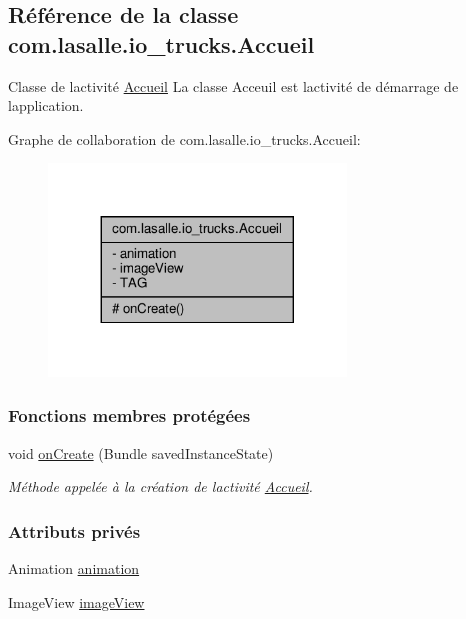 \hypertarget{classcom_1_1lasalle_1_1io__trucks_1_1_accueil}{}\subsection{Référence de la classe com.\+lasalle.\+io\+\_\+trucks.\+Accueil}
\label{classcom_1_1lasalle_1_1io__trucks_1_1_accueil}


Classe de l\textquotesingle{}activité \hyperlink{classcom_1_1lasalle_1_1io__trucks_1_1_accueil}{Accueil}  La classe Acceuil est l\textquotesingle{}activité de démarrage de l\textquotesingle{}application.  




Graphe de collaboration de com.\+lasalle.\+io\+\_\+trucks.\+Accueil\+:
\nopagebreak
\begin{figure}[H]
\begin{center}
\leavevmode
\includegraphics[width=224pt]{classcom_1_1lasalle_1_1io__trucks_1_1_accueil__coll__graph}
\end{center}
\end{figure}
\subsubsection*{Fonctions membres protégées}
\begin{DoxyCompactItemize}
\item 
void \hyperlink{classcom_1_1lasalle_1_1io__trucks_1_1_accueil_acd7cff413b44344de6b037c85f4f50bb}{on\+Create} (Bundle saved\+Instance\+State)
\begin{DoxyCompactList}\small\item\em Méthode appelée à la création de l\textquotesingle{}activité \hyperlink{classcom_1_1lasalle_1_1io__trucks_1_1_accueil}{Accueil}. \end{DoxyCompactList}\end{DoxyCompactItemize}
\subsubsection*{Attributs privés}
\begin{DoxyCompactItemize}
\item 
Animation \hyperlink{classcom_1_1lasalle_1_1io__trucks_1_1_accueil_a61fc1cafddccd078251374fa264adc4f}{animation}
\item 
Image\+View \hyperlink{classcom_1_1lasalle_1_1io__trucks_1_1_accueil_a63484f52fc632e91aad7275ea7be0f7b}{image\+View}
\end{DoxyCompactItemize}
